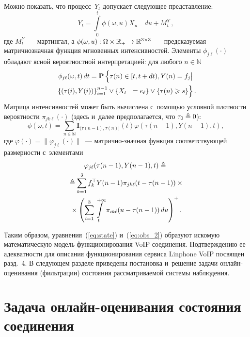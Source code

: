 \begin{multicols}{2}
Можно показать, что процесс~$Y_t$ допускает следующее представление:
\begin{equation}
Y_t = \int\limits_0^t \phi(\omega,u)X_{u-}\,du+M^Y_t\,, 
\label{eq:obs_2}
\end{equation}
где $M^Y_t$~--- мартингал, а $\phi(\omega,u):\Omega \times
\mathbb{R}_+ \hm\to \mathbb{R}^{3 \times 3}$~--- предсказуемая
матричнозначная функция мгновенных интенсивностей. Элементы
$\phi_{j\ell}(\cdot)$ обладают ясной вероятностной интерпретацией:
для любого $n \in \mathbb{N}$ 
\begin{multline*}
  \phi_{j\ell}(\omega,t)\,dt =
  \pc\left\{
  \vphantom{\left\{\left(\tau(i),Y(i)\right)\right\}_{i=1}^{n-1}} 
  \tau(n) \in [t,t+dt),Y(n)= f_j
  \bigl|\right.\\
  {}\left.
  \left\{\left(\tau(i),Y(i)\right)\right\}_{i=1}^{n-1}\vee 
  \{X_{t-}=e_{\ell}\} \vee \{\tau(n)\geqslant s\}\right\}.
 \end{multline*}
Матрица интенсивностей может быть вычислена с~помощью условной
плотности вероятности $\pi_{jk\ell}(\cdot)$ (здесь и~далее
предполагается, что $\tau_0 \triangleq 0$):
 \begin{equation*}
 \phi(\omega,t) = \sum\limits_{n \in \mathbb{N}}
 \mathbf{I}_{(\tau(n-1),\tau(n)]}(t)\varphi(\tau(n-1),Y(n-1),t),
 \end{equation*}
где $\varphi(\cdot)=\|\varphi_{j\ell}(\cdot)\|$~--- матрично-значная
функция соответствующей размерности с~элементами
 \begin{multline*}
 \varphi_{j\ell}(\tau(n-1),Y(n-1),t) \triangleq {}\\ 
 {}\triangleq
 \sum\limits_{k=1}^3
  f_k^{\top}Y(n-1)\pi_{jk\ell}(t-\tau(n-1))\times{}\\
  {}\times \left(
 \sum\limits_{i=1}^3
  \int\limits_{t}^{+\infty}\pi_{ik\ell}(u-\tau(n-1))\,du\right)^+.
 \end{multline*}

Таким образом, уравнения~(\ref{eq:state}) и~(\ref{eq:obs_2})
образуют искомую математическую модель функционирования
VoIP-со\-еди\-не\-ния. Подтверждению ее адекватности для описания
функционирования сервиса Linphone VoIP посвящен
разд.~4. В следующем разделе приведены постановка 
и~решение задачи он\-лайн-оце\-ни\-ва\-ния (фильтрации) состояния
рассматриваемой системы наблюдения.

\section{Задача онлайн-оценивания состояния соединения} %


\end{multicols}
